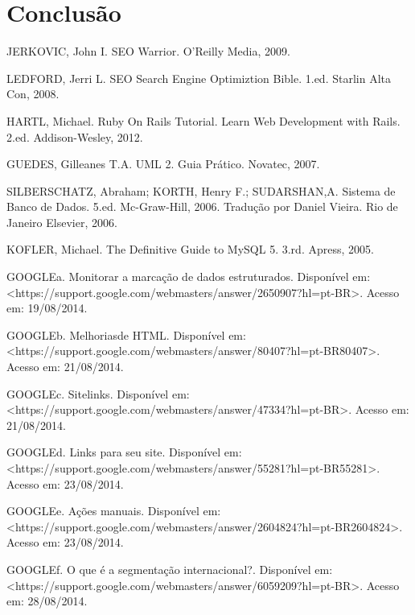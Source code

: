 \documentclass[
	12pt,				%
	openright,			%
	twoside,			%
	a4paper,			%
	english,			%
	french,				%
	spanish,			%
	brazil				%
	]{abntex2}
\begin{document}
\chapter*[Conclusão]{Conclusão}


\postextual

% 

JERKOVIC, John I. SEO Warrior. O'Reilly Media, 2009.

LEDFORD, Jerri L. SEO Search Engine Optimiztion Bible. 1.ed. Starlin Alta Con, 2008.

HARTL, Michael. Ruby On Rails Tutorial. Learn Web Development with Rails. 2.ed. Addison-Wesley, 2012.

GUEDES, Gilleanes T.A. UML 2. Guia Prático. Novatec, 2007.

SILBERSCHATZ, Abraham; KORTH, Henry F.; SUDARSHAN,A. Sistema de Banco de Dados. 5.ed. Mc-Graw-Hill, 2006. Tradução por Daniel Vieira. Rio de Janeiro Elsevier, 2006.

KOFLER, Michael. The Definitive Guide to MySQL 5. 3.rd. Apress, 2005.

GOOGLEa. Monitorar a marcação de dados estruturados. Disponível em: <https://support.google.com/webmasters/answer/2650907?hl=pt-BR>. Acesso  em: 19/08/2014.

GOOGLEb. Melhoriasde HTML. Disponível em: <https://support.google.com/webmasters/answer/80407?hl=pt-BR80407>. Acesso em: 21/08/2014.

GOOGLEc. Sitelinks. Disponível em: <https://support.google.com/webmasters/answer/47334?hl=pt-BR>. Acesso em: 21/08/2014.

GOOGLEd. Links para seu site. Disponível em: <https://support.google.com/webmasters/answer/55281?hl=pt-BR55281>. Acesso em: 23/08/2014.

GOOGLEe. Ações manuais. Disponível em: <https://support.google.com/webmasters/answer/2604824?hl=pt-BR2604824>. Acesso em: 23/08/2014.

GOOGLEf. O que é a segmentação internacional?. Disponível em: <https://support.google.com/webmasters/answer/6059209?hl=pt-BR>. Acesso em: 28/08/2014.
\end{document}
